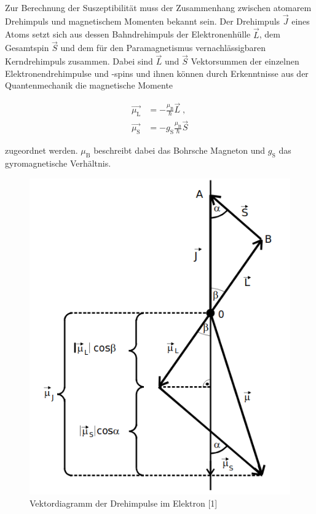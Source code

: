 Zur Berechnung der Suszeptibilität muss der Zusammenhang zwischen atomarem Drehimpuls
und magnetischem Momenten bekannt sein. Der Drehimpuls $\vec{J}$ eines Atoms setzt sich
aus dessen Bahndrehimpuls der Elektronenhülle $\vec{L}$, dem Gesamtspin $\vec{S}$
und dem für den Paramagnetismus vernachlässigbaren Kerndrehimpuls zusammen.
Dabei sind $\vec{L}$ und $\vec{S}$ Vektorsummen der einzelnen Elektronendrehimpulse
und -spins und ihnen können durch Erkenntnisse aus der Quantenmechanik die 
magnetische Momente

\begin{align}
    \vec{\mu_\text{L}} &= - \frac{\mu_\text{B}}{\hbar} \vec{L} \; \text{,} \\
    \vec{\mu_\text{S}} &= - g_\text{S} \frac{\mu_\text{B}}{\hbar} \vec{S}
\end{align}

zugeordnet werden.
$\mu_\text{B}$ beschreibt dabei das Bohrsche Magneton und $g_\text{S}$ das
gyromagnetische Verhältnis.

\begin{figure} [H]
    \centering
    \includegraphics[scale=0.5]{content/bild3.png}
    \caption{Vektordiagramm der Drehimpulse im Elektron [1]}
    \label{fig:plot3}
  \end{figure}

